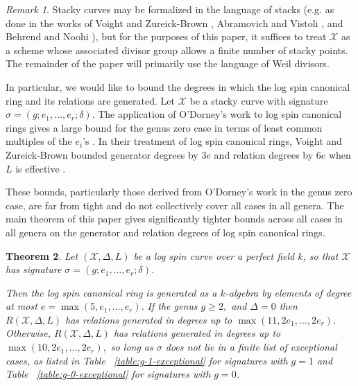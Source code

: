\documentclass{amsart}
\theoremstyle{plain}
\newtheorem{thm}{Theorem}[section]
\theoremstyle{definition}
\theoremstyle{remark}
\newtheorem{rem}[thm]{Remark}
\numberwithin{equation}{section}
\newcommand \sx{\mathscr X}
\DeclareMathOperator\di{Div}
\newcommand \subhalf[1]{\frac{{#1} - 1}{2{#1}}}
\newcommand{\halfcan}{L}
\begin{document}
\begin{rem}
\label{rem:stack-formalism}
Stacky curves may be formalized in the language of stacks (e.g. as
done in the works of Voight and Zureick-Brown \cite{vzb:stacky},
Abramovich and Vistoli \cite{abramovich-vistoli:compactifying}, and
Behrend and Noohi \cite{behrend-noohi:uniformization}), but for the
purposes of this paper, it suffices to treat $\sx$ as a scheme
whose associated divisor group allows a finite number of stacky
points. The remainder of the paper will primarily use the language
of Weil divisors.
\end{rem}


In particular, we would like to bound the degrees in which the
log spin canonical ring and its relations are generated. Let
$\sx$ be a stacky curve with signature $\sigma = (g; e_1, \ldots,
e_r; \delta)$. The application of O'Dorney's work to log spin
canonical rings gives a large bound for the genus zero case in
terms of least common multiples of the $e_i$'s \cite[Chapter 5]
{dorney:canonical}. In their treatment of log spin canonical
rings, Voight and Zureick-Brown bounded generator degrees by $3e$
and relation degrees by $6e$ when $\halfcan$ is effective
\cite[Corollary 10.4.6]{vzb:stacky}.

These bounds, particularly those derived from O'Dorney's work
in the genus zero case, are far from tight and do not collectively
cover all cases in all genera. The main theorem of this paper
gives significantly tighter bounds across all cases in all
genera on the generator and relation degrees of log spin canonical
rings.

\begin{thm}
\label{thm:main}
Let $(\sx, \Delta, \halfcan)$ be a log spin curve over a perfect
field $k$, so that $\sx$ has signature $\sigma = (g; e_1, \ldots,
e_r; \delta)$.

Then the log spin canonical ring is generated as a $k$-algebra by 
elements of degree at most $e = \max(5, e_1, \ldots, e_r).$ If the 
genus $g \geq 2,$ and $\Delta = 0$ then $R(\sx, \Delta, \halfcan)$
has relations generated in degrees up to $\max(11, 2e_1, \ldots,
2e_r)$. Otherwise, $R(\sx, \Delta, \halfcan)$ has relations
generated in degrees up to $\max(10, 2e_1, \ldots, 2e_r),$ so long
as $\sigma$ does not lie in a finite list of exceptional cases, as
listed in Table ~\ref{table:g-1-exceptional} for signatures with $g
= 1$ and Table ~\ref{table:g-0-exceptional} for signatures with $g =
0$.
\end{thm}
\end{document}
